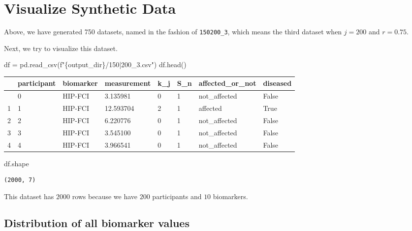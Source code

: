 \documentclass[
  letterpaper,
  DIV=11,
  numbers=noendperiod]{scrreprt}
\newenvironment{Shaded}{\begin{snugshade}}{\end{snugshade}}
\newcommand{\NormalTok}[1]{\textcolor[rgb]{0.00,0.23,0.31}{#1}}
\newcommand{\OperatorTok}[1]{\textcolor[rgb]{0.37,0.37,0.37}{#1}}
\newcommand{\SpecialCharTok}[1]{\textcolor[rgb]{0.37,0.37,0.37}{#1}}
\newcommand{\SpecialStringTok}[1]{\textcolor[rgb]{0.13,0.47,0.30}{#1}}
\begin{document}
\section{Visualize Synthetic Data}\label{visualize-synthetic-data}

Above, we have generated 750 datasets, named in the fashion of
\texttt{150\textbar{}200\_3}, which means the third dataset when
\(j = 200\) and \(r = 0.75\).

Next, we try to visualize this dataset.

\begin{Shaded}
\begin{Highlighting}[]
\NormalTok{df }\OperatorTok{=}\NormalTok{ pd.read\_csv(}\SpecialStringTok{f"}\SpecialCharTok{\{}\NormalTok{output\_dir}\SpecialCharTok{\}}\SpecialStringTok{/150|200\_3.csv"}\NormalTok{)}
\NormalTok{df.head()}
\end{Highlighting}
\end{Shaded}

\begin{longtable}[]{@{}llllllll@{}}
\toprule\noalign{}
& participant & biomarker & measurement & k\_j & S\_n &
affected\_or\_not & diseased \\
\midrule\noalign{}
\endhead
\bottomrule\noalign{}
\endlastfoot
0 & 0 & HIP-FCI & 3.135981 & 0 & 1 & not\_affected & False \\
1 & 1 & HIP-FCI & 12.593704 & 2 & 1 & affected & True \\
2 & 2 & HIP-FCI & 6.220776 & 0 & 1 & not\_affected & False \\
3 & 3 & HIP-FCI & 3.545100 & 0 & 1 & not\_affected & False \\
4 & 4 & HIP-FCI & 3.966541 & 0 & 1 & not\_affected & False \\
\end{longtable}

\begin{Shaded}
\begin{Highlighting}[]
\NormalTok{df.shape}
\end{Highlighting}
\end{Shaded}

\begin{verbatim}
(2000, 7)
\end{verbatim}

This dataset has \(2000\) rows because we have \(200\) participants and
\(10\) biomarkers.

\subsection{Distribution of all biomarker
values}\label{distribution-of-all-biomarker-values}
\end{document}
